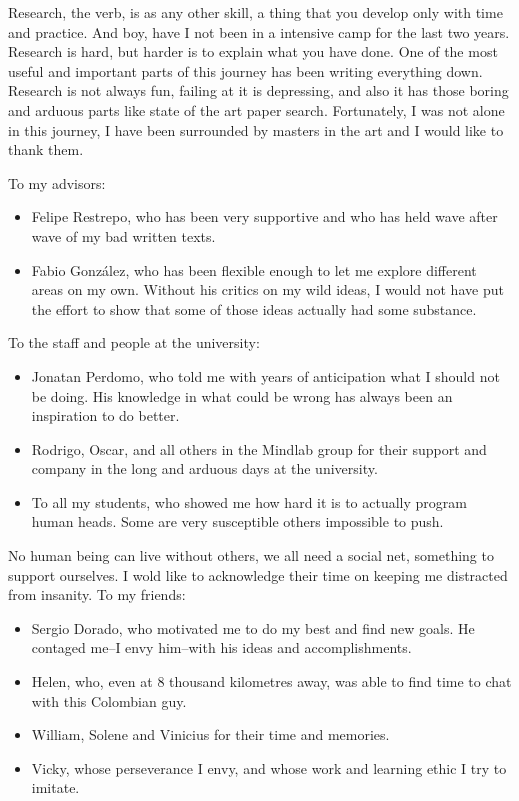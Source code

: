 \documentclass[
11pt, %
english, %
singlespacing, %
headsepline, %
]{MastersDoctoralThesis} %
\providecommand{\tightlist}{%
  \setlength{\itemsep}{0pt}\setlength{\parskip}{0pt}}
\begin{document}
\begin{acknowledgements}
\addchaptertocentry{\acknowledgementname} %

Research, the verb, is as any other skill, a thing that you develop only with time and
practice. And boy, have I not been in a intensive camp for the last two years. Research is
hard, but harder is to explain what you have done. One of the most useful and important
parts of this journey has been writing everything down.  Research is not always fun,
failing at it is depressing, and also it has those boring and arduous parts like state of
the art paper search. Fortunately, I was not alone in this journey, I have been surrounded
by masters in the art and I would like to thank them.

To my advisors:

\begin{itemize}
\tightlist
\item Felipe Restrepo, who has been very supportive and who has held wave after wave of my
  bad written texts.
\item Fabio González, who has been flexible enough to let me explore different areas on my
  own. Without his critics on my wild ideas, I would not have put the effort to show that
  some of those ideas actually had some substance.
\end{itemize}

To the staff and people at the university:

\begin{itemize}
\tightlist
\item Jonatan Perdomo, who told me with years of anticipation what I should not be doing.
  His knowledge in what could be wrong has always been an inspiration to do better.
\item Rodrigo, Oscar, and all others in the Mindlab group for their support and company in the long and
  arduous days at the university.
\item To all my students, who showed me how hard it is to actually program human heads.
  Some are very susceptible others impossible to push.
\end{itemize}

No human being can live without others, we all need a social net, something to support
ourselves. I wold like to acknowledge their time on keeping me distracted from insanity.
To my friends:

\begin{itemize}
\tightlist
\item Sergio Dorado, who motivated me to do my best and find new goals. He contaged me--I
  envy him--with his ideas and accomplishments.
\item Helen, who, even at 8 thousand kilometres away, was able to find time to chat
  with this Colombian guy.
\item William, Solene and Vinicius for their time and memories.
\item Vicky, whose perseverance I envy, and whose work and learning ethic I try to imitate.
\end{itemize}


\end{acknowledgements}
\end{document}
